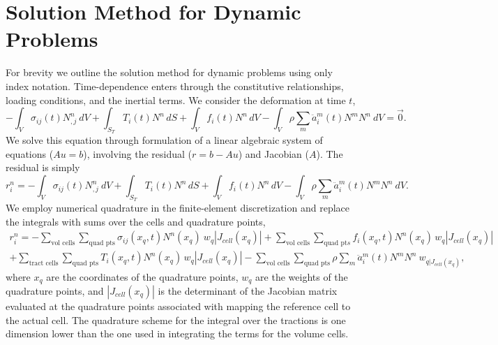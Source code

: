 \section{Solution Method for Dynamic Problems}

For brevity we outline the solution method for dynamic problems using
only index notation. Time-dependence enters through the constitutive
relationships, loading conditions, and the inertial terms. We consider
the deformation at time $t$,
\begin{equation}
\label{eq:elasticity:integral:dynamic:t}
-\int_{V}\sigma_{ij}(t)N_{,j}^{n}\: dV+\int_{S_{T}}T_{i}(t)N^{n}\, dS+\int_{V}f_{i}(t)N^{n}\, dV-\int_{V}\rho\sum_{m}\ddot{a}_{i}^{m}(t)N^{m}N^{n}\ dV=\vec{0}.
\end{equation}
We solve this equation through formulation of a linear algebraic system
of equations ($Au=b$), involving the residual ($r=b-Au$) and Jacobian
($A$). The residual is simply
\begin{equation}
r_{i}^{n}=-\int_{V}\sigma_{ij}(t)N_{,j}^{n}\: dV+\int_{S_{T}}T_{i}(t)N^{n}\, dS+\int_{V}f_{i}(t)N^{n}\, dV-\int_{V}\rho\sum_{m}\ddot{a}_{i}^{m}(t)N^{m}N^{n}\ dV.
\end{equation}
We employ numerical quadrature in the finite-element discretization
and replace the integrals with sums over the cells and quadrature
points,
\begin{multline}
r_{i}^{n}=-\sum_{\text{vol cells}}\sum_{\text{quad pts}}\sigma_{ij}(x_{q},t)N^{n}(x_{q})\: w_{q}|J_{cell}(x_{q})|+\sum_{\text{vol cells}}\sum_{\text{quad pt}s}f_{i}(x_{q},t)N^{n}(x_{q})\, w_{q}|J_{cell}(x_{q})|\\
+\sum_{\text{tract cells}}\sum_{\text{quad pts}}T_{i}(x_{q},t)N^{n}(x_{q})\, w_{q}|J_{cell}(x_{q})|-\sum_{\text{vol cells}}\sum_{\text{quad pts}}\rho\sum_{m}\ddot{a}_{i}^{m}(t)N^{m}N^{n}\ w_{q|J_{cell}(x_{q})},
\end{multline}
where $x_{q}$ are the coordinates of the quadrature points, $w_{q}$
are the weights of the quadrature points, and $|J_{cell}(x_{q})|$
is the determinant of the Jacobian matrix evaluated at the quadrature
points associated with mapping the reference cell to the actual cell.
The quadrature scheme for the integral over the tractions is one dimension
lower than the one used in integrating the terms for the volume cells. 

